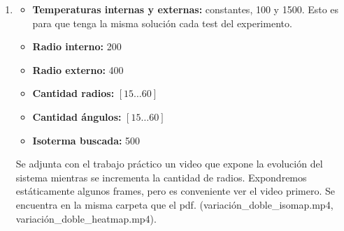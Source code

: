 \begin{enumerate}
	\item \begin{itemize}
						\item \textbf{Temperaturas internas y externas:} constantes, 100 y 1500. Esto es para que tenga la misma solución cada test del experimento.
						\item \textbf{Radio interno:} 200
						\item \textbf{Radio externo:} 400
						\item \textbf{Cantidad radios:} $[15\dots60]$
						\item \textbf{Cantidad ángulos:} $[15\dots60]$
						\item \textbf{Isoterma buscada:} 500
					\end{itemize}
	Se adjunta con el trabajo práctico un video que expone la evolución del sistema mientras se incrementa la cantidad de radios. Expondremos estáticamente algunos frames, pero es conveniente ver el video primero. Se encuentra en la misma carpeta que el pdf. (variación\_doble\_isomap.mp4, variación\_doble\_heatmap.mp4).


\end{enumerate}
